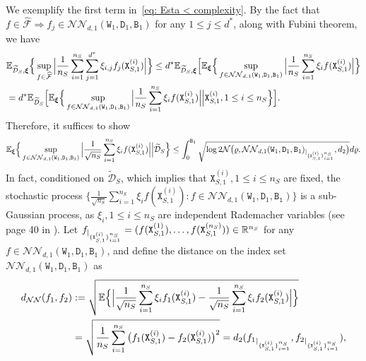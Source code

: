     We exemplify the first term in~\eqref{eq: Esta < complexity}. By the fact that $f \in \widehat{\mathcal{F}} \Rightarrow f_j \in \mathcal{NN}_{d,1}(\mathtt{W}_1, \mathtt{D}_1, \mathtt{B}_1)$ for any $1 \leq j \leq d^*$, along with Fubini theorem, we have 
    \begin{align*}
        &\mathbb{E}_{\widetilde{\mathcal{D}}_S, \bm{\xi}}\Big\{\sup_{f \in \widehat{\mathcal{F}}}\Big\vert\frac{1}{n_S}\sum_{i=1}^{n_S}\sum_{j=1}^{d^*}\xi_{i,j}f_j(\mathtt{X}_{S,1}^{(i)})\Big\vert\Big\} \leq d^* \mathbb{E}_{\widetilde{\mathcal{D}}_S,\bm{\xi}}\Big[\mathbb{E}_{\bm{\xi}}\Big\{\sup_{f \in \mathcal{NN}_{d,1}(\mathtt{W}_1, \mathtt{D}_1, \mathtt{B}_1)}\Big\vert\frac{1}{n_S}\sum_{i=1}^{n_S}\xi_{i}f(\mathtt{X}_{S,1}^{(i)})\Big\vert\Big\} \\
        &= d^* \mathbb{E}_{\widetilde{\mathcal{D}}_S}\Big[\mathbb{E}_{\bm{\xi}}\Big\{\sup_{f \in \mathcal{NN}_{d,1}(\mathtt{W}_1, \mathtt{D}_1, \mathtt{B}_1)}\Big\vert\frac{1}{n_S}\sum_{i=1}^{n_S}\xi_{i}f(\mathtt{X}_{S,1}^{(i)})\Big\vert \Big\vert \mathtt{X}_{S,1}^{(i)}, 1\leq i\leq n_S\Big\}\Big].    
    \end{align*}
    Therefore, it suffices to show   
    \begin{align*}
        \mathbb{E}_{\bm{\xi}}\Big\{\sup_{f \in \mathcal{NN}_{d,1}(\mathtt{W}_1, \mathtt{D}_1, \mathtt{B}_1)}\Big\vert\frac{1}{\sqrt{n_S}}\sum_{i=1}^{n_S}\xi_{i}f(\mathtt{X}_{S,1}^{(i)})\Big\vert \Big\vert \widetilde{\mathcal{D}}_S\Big\} \leq \int_0^{\mathtt{B}_1}\sqrt{\log2\mathcal{N}\big(\varrho, \mathcal{NN}_{d,1}(\mathtt{W}_1, \mathtt{D}_1, \mathtt{B}_1)_{\vert_{\{\mathtt{X}^{(i)}_{S,1}\}_{i=1}^{n_S}}}, d_2\big)}d\varrho.
    \end{align*}
    In fact, conditioned on $\widetilde{\mathcal{D}}_S$, which implies that $\mathtt{X}_{S,1}^{(i)}, 1\leq i\leq n_S$ are fixed, the stochastic process $\{\frac{1}{\sqrt{n_S}}\sum_{i=1}^{n_S}\xi_{i}f(\mathtt{X}_{S,1}^{(i)}): f \in \mathcal{NN}_{d,1}(\mathtt{W}_1, \mathtt{D}_1, \mathtt{B_1})\}$ is a sub-Gaussian process, as $\xi_i, 1\leq i\leq n_S$ are independent Rademacher variables (see page 40 in \citet{gine2016mathematical}). Let $f_{\vert_{\{\mathtt{X}_{S,1}^{(i)}\}_{i=1}^{n_S}}} = (f(\mathtt{X}_{S,1}^{(1)}), \ldots, f(\mathtt{X}_{S,1}^{(n_S)})) \in \mathbb{R}^{n_S}$ for any $f \in \mathcal{NN}_{d,1}(\mathtt{W}_1, \mathtt{D}_1, \mathtt{B}_1)$, and define the distance on the index set $\mathcal{NN}_{d,1}(\mathtt{W}_1, \mathtt{D}_1, \mathtt{B}_1)$ as 
    \begin{align*}
        d_{\mathcal{NN}}(f_1, f_2) &:= \sqrt{\mathbb{E}\Big\{\Big\vert\frac{1}{\sqrt{n_S}}\sum_{i=1}^{n_S}\xi_if_1(\mathtt{X}_{S,1}^{(i)}) - \frac{1}{\sqrt{n_S}}\sum_{i=1}^{n_S}\xi_if_2(\mathtt{X}_{S,1}^{(i)})\Big\vert\Big\}} \\
        &= \sqrt{\frac{1}{n_S}\sum_{i=1}^{n_S}\big(f_1(\mathtt{X}_{S,1}^{(i)}) - f_2(\mathtt{X}_{S,1}^{(i)})\big)^2}  = d_2( {f_1}_{\vert_{\{\mathtt{X}_{S,1}^{(i)}\}_{i=1}^{n_S}}},{f_2}_{\vert_{\{\mathtt{X}_{S,1}^{(i)}\}_{i=1}^{n_S}}}),
    \end{align*}
